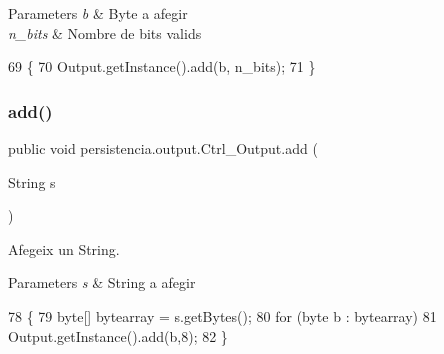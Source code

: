 \begin{DoxyParams}{Parameters}
{\em b} & Byte a afegir \\
\hline
{\em n\+\_\+bits} & Nombre de bits valids \\
\hline
\end{DoxyParams}

\begin{DoxyCode}
69                                             \{
70         Output.getInstance().add(b, n\_bits);
71     \}
\end{DoxyCode}
\mbox{\label{classpersistencia_1_1output_1_1Ctrl__Output_a0e3bedb0b88d0e60b228cc49143e6f0e}} 
\subsubsection{\texorpdfstring{add()}{add()}\hspace{0.1cm}{\footnotesize\ttfamily [2/6]}}
{\footnotesize\ttfamily public void persistencia.\+output.\+Ctrl\+\_\+\+Output.\+add (\begin{DoxyParamCaption}\item[{String}]{s }\end{DoxyParamCaption})\hspace{0.3cm}{\ttfamily [inline]}}



Afegeix un String. 


\begin{DoxyParams}{Parameters}
{\em s} & String a afegir \\
\hline
\end{DoxyParams}

\begin{DoxyCode}
78                               \{
79         byte[] bytearray = s.getBytes();
80         \textcolor{keywordflow}{for} (byte b : bytearray) 
81             Output.getInstance().add(b,8);
82     \}
\end{DoxyCode}
\mbox{\label{classpersistencia_1_1output_1_1Ctrl__Output_a4070b40016edf1d959b3f7c60c90ef10}} 
